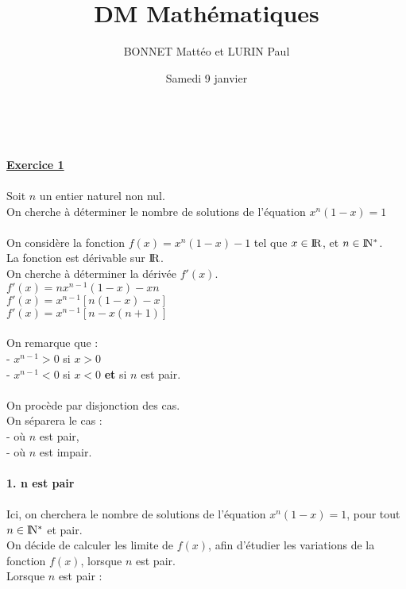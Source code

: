 \documentclass{article}
\title{DM Mathématiques}
\author{BONNET Mattéo et LURIN Paul }
\date{Samedi 9 janvier}
\begin{document}
 \\
    \begin{exo2}
        \maketitle 
        \underline{\textbf{\large{Exercice 1}}} \\ \\
        
            Soit $n$ un entier naturel non nul. \\
            On cherche à déterminer le nombre de solutions de l'équation $x^{n}(1-x)=1$ \\ \\
            On considère la fonction $f(x) = x^{n}(1-x)-1$ tel que $x\in{\rm I\!R}$, et $n\in{\rm I\!N^*}$.\\
            La fonction est dérivable sur ${\rm I\!R}$. \\
            On cherche à déterminer la dérivée $f'(x)$. \\
            
                $f'(x)=nx^{n-1}(1-x)-xn$ \\
                
                $f'(x)=x^{n-1}[n(1-x)-x]$ \\
                
                $f'(x)=x^{n-1}[n-x(n+1)]$ \\ \\
            On remarque que : \\
            
            - $x^{n-1}>0$ si $x>0$ \\
            
            - $x^{n-1}<0$ si $x<0$ \textbf{et} si $n$ est pair. \\ \\
            On procède par disjonction des cas. \\
            On séparera le cas : \\ 
            - où $n$ est pair, \\
            - où $n$ est impair. \\ \\
            
            \textbf{\large{1. n est pair}} \\ \\
            
                Ici, on cherchera le nombre de solutions de l'équation $x^{n}(1-x)=1$, pour tout $n\in{\rm I\!N^*}$ et pair. \\
                On décide de calculer les limite de $f(x)$, afin d'étudier les variations de la fonction $f(x)$, lorsque $n$ est pair.\\
                Lorsque $n$ est pair : \\
                

\end{exo2}
\end{document}
